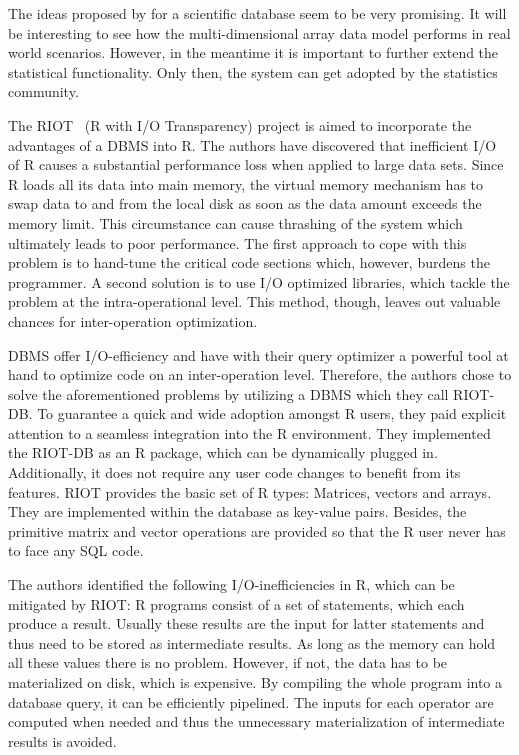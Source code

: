 The ideas proposed by \citeauthor{stonebraker:2009a} for a scientific database seem to be very promising.
It will be interesting to see how the multi-dimensional array data model performs in real world scenarios.
However, in the meantime it is important to further extend the statistical functionality.
Only then, the system can get adopted by the statistics community.

The RIOT~\cite{zhang:apa2009a} (R with I/O Transparency) project is aimed to incorporate the advantages of a DBMS into R.
The authors \citeauthor{zhang:apa2009a} have discovered that inefficient I/O of R causes a substantial performance loss when applied to large data sets.
Since R loads all its data into main memory, the virtual memory mechanism has to swap data to and from the local disk as soon as the data amount exceeds the memory limit.
This circumstance can cause thrashing of the system which ultimately leads to poor performance.
The first approach to cope with this problem is to hand-tune the critical code sections which, however, burdens the programmer.
A second solution is to use I/O optimized libraries, which tackle the problem at the intra-operational level.
This method, though, leaves out valuable chances for inter-operation optimization.

DBMS offer I/O-efficiency and have with their query optimizer a powerful tool at hand to optimize code on an inter-operation level.
Therefore, the authors chose to solve the aforementioned problems by utilizing a DBMS which they call RIOT-DB.
To guarantee a quick and wide adoption amongst R users, they paid explicit attention to a seamless integration into the R environment.
They implemented the RIOT-DB as an R package, which can be dynamically plugged in.
Additionally, it does not require any user code changes to benefit from its features.
RIOT provides the basic set of R types: Matrices, vectors and arrays.
They are implemented within the database as key-value pairs.
Besides, the primitive matrix and vector operations are provided so that the R user never has to face any SQL code.

The authors identified the following I/O-inefficiencies in R, which can be mitigated by RIOT:
R programs consist of a set of statements, which each produce a result.
Usually these results are the input for latter statements and thus need to be stored as intermediate results.
As long as the memory can hold all these values there is no problem.
However, if not, the data has to be materialized on disk, which is expensive.
By compiling the whole program into a database query, it can be efficiently pipelined.
The inputs for each operator are computed when needed and thus the unnecessary materialization of intermediate results is avoided.

